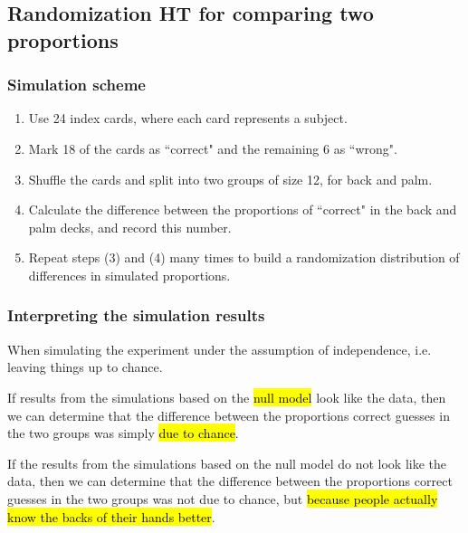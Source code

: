 \subsection{Randomization HT for comparing two proportions}


\begin{frame}
\frametitle{Simulation scheme}

\begin{enumerate}

\item Use 24 index cards, where each card represents a subject.

\item Mark 18 of the cards as ``correct" and the remaining 6 as ``wrong".

\item Shuffle the cards and split into two groups of size 12, for back and palm.

\item Calculate the difference between the proportions of ``correct" in the back and palm decks, and record this number.

\item Repeat steps (3) and (4) many times to build a randomization distribution of differences in simulated proportions.

\end{enumerate}

\end{frame}


\begin{frame}
\frametitle{Interpreting the simulation results}

When simulating the experiment under the assumption of independence, i.e. leaving things up to chance. \\

\vspace{0.5cm}

If results from the simulations based on the \hl{null model} look like the data, then we can determine that the difference between the proportions correct guesses in the two groups was simply \hl{due to chance}. \\

\vspace{0.5cm}

If the results from the simulations based on the null model do not look like the data, then we can determine that the difference between the proportions correct guesses in the two groups was not due to chance, but \hl{because people actually know the backs of their hands better}.

\end{frame}

